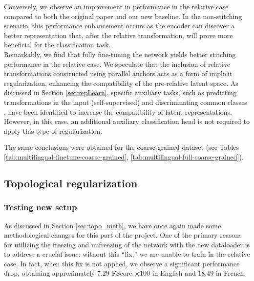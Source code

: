 \documentclass[../main.tex]{subfiles}
\begin{document}
Conversely, we observe an improvement in performance in the relative case compared to both the original paper and our new baseline. In the non-stitching scenario, this performance enhancement occurs as the encoder can discover a better representation that, after the relative transformation, will prove more beneficial for the classification task.\\

Remarkably, we find that fully fine-tuning the network yields better stitching performance in the relative case. We speculate that the inclusion of relative transformations constructed using parallel anchors acts as a form of implicit regularization, enhancing the compatibility of the pre-relative latent space. As discussed in Section \ref{sec:repLearn}, specific auxiliary tasks, such as predicting transformations in the input (self-supervised) and discriminating common classes \cite{gygli_towards_2020}, have been identified to increase the compatibility of latent representations. However, in this case, an additional auxiliary classification head is not required to apply this type of regularization.

\begin{mathNote}
The same conclusions were obtained for the coarse-grained dataset (see Tables \ref{tab:multilingual-finetune-coarse-grained}, \ref{tab:multilingual-full-coarse-grained}).
\end{mathNote}

\subsection{Topological regularization}
\subsubsection*{Testing new setup}

As discussed in Section \ref{sec:topo_meth}, we have once again made some methodological changes for this part of the project. One of the primary reasons for utilizing the freezing and unfreezing of the network with the new dataloader is to address a crucial issue: without this ``fix,'' we are unable to train in the relative case. In fact, when this fix is not applied, we observe a significant performance drop, obtaining approximately $7.29$ FScore $\times 100$ in English and $18.49$ in French.\\
\end{document}
